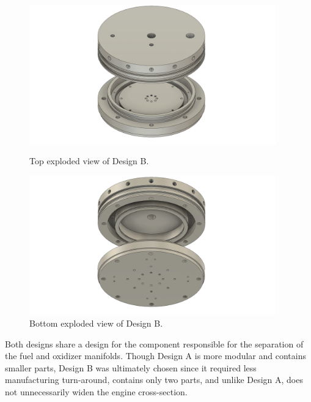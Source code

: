 \documentclass[9pt]{article} %
\numberwithin{equation}{section} %
\begin{document}
\begin{figure}
    \centering
    \begin{minipage}{0.495\textwidth}
        \centering
        \includegraphics[scale=0.5, width=0.95\textwidth, trim={4cm 1cm 4cm 0cm}, clip]{cad_files/Final Injector Assembly EXPLODE1.png} %
        \caption{Top exploded view of Design B.}
        \label{fig:design_b_explode_1}
    \end{minipage}\hfill
    \begin{minipage}{0.495\textwidth}
        \centering
        \includegraphics[scale=0.5, width=0.95\textwidth, trim={4cm 1cm 4cm 0cm}, clip]{cad_files/Final Injector Assembly EXPLODE2.png} %
        \caption{Bottom exploded view of Design B.}
        \label{fig:design_b_explode_2}
    \end{minipage}
\end{figure} 

Both designs share a design for the component responsible for the separation of the fuel and oxidizer manifolds. Though Design A is more modular and contains smaller parts, Design B was ultimately chosen since it required less manufacturing turn-around, contains only two parts, and unlike Design A, does not unnecessarily widen the engine cross-section.
\end{document}
